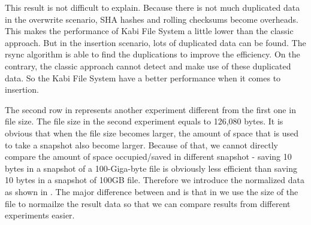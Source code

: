     This result is not difficult to explain. Because there is not much duplicated data in the overwrite scenario, SHA hashes and rolling checksums become overheads. This makes the performance of Kabi File System a little lower than the classic approach. But in the insertion scenario, lots of duplicated data can be found. The rsync algorithm is able to find the duplications to improve the efficiency. On the contrary, the classic approach cannot detect and make use of these duplicated data. So the Kabi File System have a better performance when it comes to insertion.
    
    The second row in  represents another experiment different from the first one in file size. The file size in the second experiment equals to 126,080 bytes. It is obvious that when the file size becomes larger, the amount of space that is used to take a snapshot also become larger. Because of that, we cannot directly compare the amount of space occupied/saved in different snapshot - saving 10 bytes in a snapshot of a 100-Giga-byte file is obviously less efficient than saving 10 bytes in a snapshot of 100GB file. Therefore we introduce the normalized data as shown in . The major difference between  and  is that in  we use the size of the file to normailze the result data so that we can compare results from different experiments easier.

